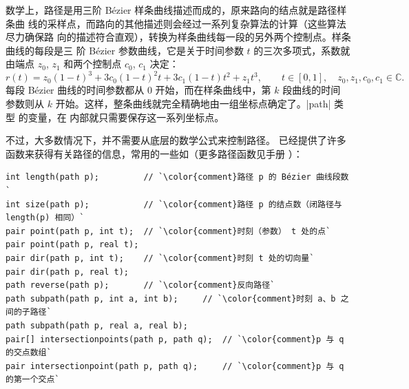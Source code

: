 数学上，路径是用三阶 Bézier 样条曲线描述而成的，原来路向的结点就是路径样条曲
线的采样点，而路向的其他描述则会经过一系列复杂算法的计算（这些算法尽力确保路
向的描述符合直观），转换为样条曲线每一段的另外两个控制点。样条曲线的每段是三
阶 Bézier 参数曲线，它是关于时间参数 $t$ 的三次多项式，系数就由端点 $z_0$,
$z_1$ 和两个控制点 $c_0$, $c_1$ 决定：
\[
  r(t) = z_0 (1-t)^3 + 3 c_0 (1-t)^2 t + 3 c_1 (1-t) t^2 + z_1 t^3,
  \qquad t \in [0,1], \quad z_0, z_1, c_0, c_1 \in \mathbb{C}.
\]
每段 Bézier 曲线的时间参数都从 $0$ 开始，而在样条曲线中，第 $k$ 段曲线的时间
参数则从 $k$ 开始。这样，整条曲线就完全精确地由一组坐标点确定了。|path| 类型
的变量，在 \Asy{} 内部就只需要保存这一系列坐标点。

不过，大多数情况下，并不需要从底层的数学公式来控制路径。\Asy{} 已经提供了许多
函数来获得有关路径的信息，常用的一些如（更多路径函数见手册 \cite{asyman}）：
\begin{lstlisting}
int length(path p);         // `\color{comment}路径 p 的 Bézier 曲线段数`
int size(path p);           // `\color{comment}路径 p 的结点数（闭路径与 length(p) 相同）`
pair point(path p, int t);  // `\color{comment}时刻（参数） t 处的点`
pair point(path p, real t);
pair dir(path p, int t);    // `\color{comment}时刻 t 处的切向量`
pair dir(path p, real t);
path reverse(path p);       // `\color{comment}反向路径`
path subpath(path p, int a, int b);     // `\color{comment}时刻 a、b 之间的子路径`
path subpath(path p, real a, real b);
pair[] intersectionpoints(path p, path q);  // `\color{comment}p 与 q 的交点数组`
pair intersectionpoint(path p, path q);     // `\color{comment}p 与 q 的第一个交点`
\end{lstlisting}

